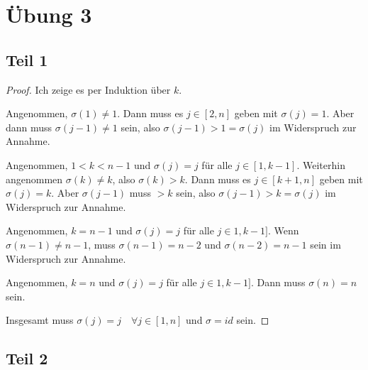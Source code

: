 \documentclass[10pt,a4paper]{article}
\begin{document}
\section*{Übung 3}

\subsection*{Teil 1}

\begin{proof}
Ich zeige es per Induktion über $k$.

Angenommen, $\sigma(1) \ne 1$.
Dann muss es $j \in [2, n]$ geben mit $\sigma(j) = 1$.
Aber dann muss $\sigma(j - 1) \ne 1$ sein, also $\sigma(j - 1) > 1 = \sigma(j)$ im Widerspruch zur Annahme.

Angenommen, $1 < k < n - 1$ und $\sigma(j) = j$ für alle $j \in [1, k - 1]$.
Weiterhin angenommen $\sigma(k) \ne k$, also $\sigma(k) > k$.
Dann muss es $j \in [k + 1, n]$ geben mit $\sigma(j) = k$.
Aber $\sigma(j - 1)$ muss $> k$ sein, also $\sigma(j - 1) > k = \sigma(j)$ im Widerspruch zur Annahme.

Angenommen, $k = n - 1$ und $\sigma(j) = j$ für alle $j \in 1, k - 1]$.
Wenn $\sigma(n - 1) \ne n - 1$, muss $\sigma(n - 1) = n - 2$ und $\sigma(n - 2) = n - 1$ sein im Widerspruch zur Annahme.

Angenommen, $k = n$ und $\sigma(j) = j$ für alle $j \in 1, k - 1]$.
Dann muss $\sigma(n) = n$ sein.

Insgesamt muss $\sigma(j) = j \quad \forall j \in [1, n]$ und $\sigma = id$ sein.
\end{proof}

\subsection*{Teil 2}
\end{document}
